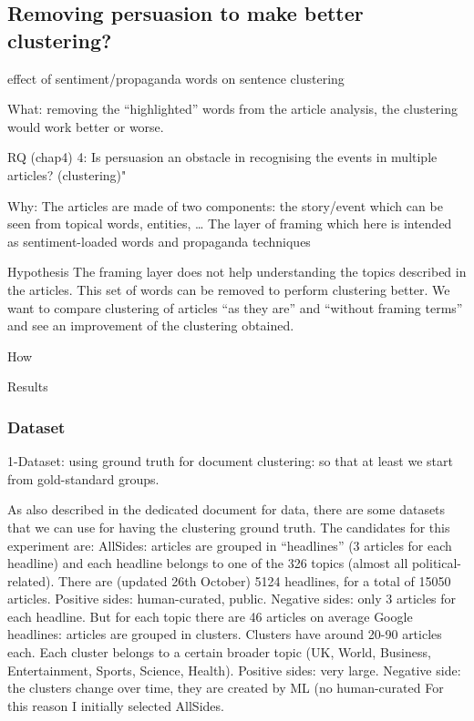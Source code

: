 \subsection{\statusorange Removing persuasion to make better clustering?}

effect of sentiment/propaganda words on sentence clustering

What: removing the “highlighted” words from the article analysis, the clustering would work better or worse.

RQ (chap4) 4: Is persuasion an obstacle in recognising the events in multiple articles? (clustering)"

Why:
The articles are made of two components:
the story/event which can be seen from topical words, entities, …
The layer of framing which here is intended as sentiment-loaded words and propaganda techniques

Hypothesis
The framing layer does not help understanding the topics described in the articles. This set of words can be removed to perform clustering better.
We want to compare clustering of articles “as they are” and “without framing terms” and see an improvement of the clustering obtained.


How

Results

\subsubsection{Dataset}

1-Dataset: using ground truth for document clustering: so that at least we start from gold-standard groups.

As also described in the dedicated document for data, there are some datasets that we can use for having the clustering ground truth. The candidates for this experiment are:
AllSides: articles are grouped in “headlines” (3 articles for each headline) and each headline belongs to one of the 326 topics (almost all political-related). There are (updated 26th October) 5124 headlines, for a total of 15050 articles. Positive sides: human-curated, public. Negative sides: only 3 articles for each headline. But for each topic there are 46 articles on average
Google headlines: articles are grouped in clusters. Clusters have around 20-90 articles each. Each cluster belongs to a certain broader topic (UK, World, Business, Entertainment, Sports, Science, Health). Positive sides: very large. Negative side: the clusters change over time, they are created by ML (no human-curated
For this reason I initially selected AllSides.

